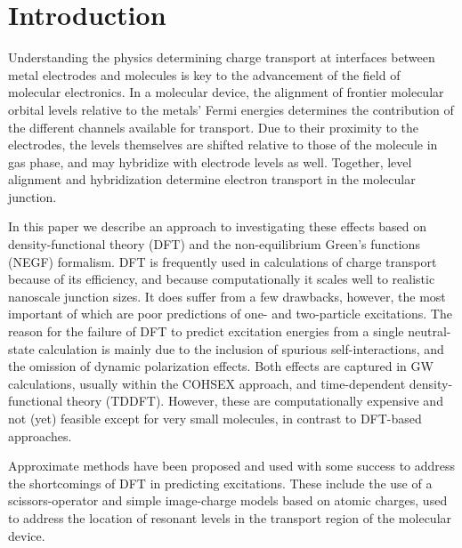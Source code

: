 \documentclass[aip,jcp,a4paper,reprint,floatfix,superscriptaddress]{revtex4-1}
\begin{document}
\section{Introduction}

Understanding the physics determining charge transport at interfaces between metal electrodes and molecules is key to the advancement of the field of molecular electronics. In a molecular device, the alignment of frontier molecular orbital levels relative to the metals' Fermi energies determines the contribution of the different channels available for transport. Due to their proximity to the electrodes, the levels themselves are shifted relative to those of the molecule in gas phase, and may hybridize with electrode levels as well. Together, level alignment and hybridization determine electron transport in the molecular junction.

In this paper we describe an approach to investigating these effects based on density-functional theory (DFT)\cite{Jones1989} and the non-equilibrium Green's functions (NEGF) formalism.\cite{Meir1992,Datta2000,Brandbyge2002,Stokbro2003a,Evers2003,Rocha2006,Rothig2006,Arnold2007,Verzijl2012} 
DFT is frequently used in calculations of charge transport because of its efficiency, and because computationally it scales well to realistic nanoscale junction sizes. It does suffer from a few drawbacks, however, the most important of which are poor predictions of one- and two-particle excitations.\cite{Jones1989,Burke2012}  
The reason for the failure of DFT to predict excitation energies from a single neutral-state calculation is mainly due to the inclusion of spurious self-interactions,\cite{Perdew1981,Toher2005} and the omission of dynamic polarization effects.\cite{Hybertsen1986,Neaton2006}
Both effects are captured in GW calculations,\cite{Aryasetiawan1998,Neaton2006,Thygesen2009} usually within the COHSEX approach,\cite{Hybertsen1986} and time-dependent density-functional theory (TDDFT).\cite{Stefanucci2004,Kurth2005,Perfetto2010} However, these are computationally expensive and not (yet) feasible except for very small molecules, in contrast to DFT-based approaches.

Approximate methods have been proposed and used with some success to address the shortcomings of DFT in predicting excitations. These include the use of a scissors-operator\cite{Quek2007,Mowbray2008} and simple image-charge models based on atomic charges,\cite{Hedegaard2005,Neaton2006,Kaasbjerg2008,Mowbray2008}
used to address the location of resonant levels in the transport region of the molecular device. 
\end{document}
